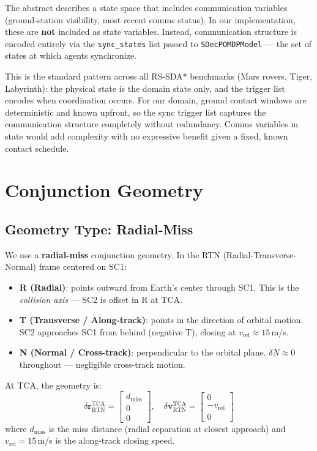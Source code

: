 \documentclass[11pt]{article}
\begin{document}
The abstract describes a state space that includes communication variables
(ground-station visibility, most recent comms status). In our implementation,
these are \textbf{not} included as state variables. Instead, communication
structure is encoded entirely via the \texttt{sync\_states} list passed to
\texttt{SDecPOMDPModel} --- the set of states at which agents synchronize.

This is the standard pattern across all RS-SDA* benchmarks (Mars rovers,
Tiger, Labyrinth): the physical state is the domain state only, and the
trigger list encodes when coordination occurs. For our domain, ground contact
windows are deterministic and known upfront, so the sync trigger list captures
the communication structure completely without redundancy. Comms variables in
state would add complexity with no expressive benefit given a fixed, known
contact schedule.

\section{Conjunction Geometry}

\subsection{Geometry Type: Radial-Miss}

We use a \textbf{radial-miss} conjunction geometry. In the RTN (Radial-Transverse-Normal)
frame centered on SC1:

\begin{itemize}
  \item \textbf{R (Radial)}: points outward from Earth's center through SC1.
        This is the \emph{collision axis} --- SC2 is offset in R at TCA.
  \item \textbf{T (Transverse / Along-track)}: points in the direction of orbital
        motion. SC2 approaches SC1 from behind (negative T), closing at
        $v_\text{rel} \approx 15$\,m/s.
  \item \textbf{N (Normal / Cross-track)}: perpendicular to the orbital plane.
        $\delta N \approx 0$ throughout --- negligible cross-track motion.
\end{itemize}

At TCA, the geometry is:
\begin{equation}
  \delta \mathbf{r}_\text{RTN}^\text{TCA} =
    \begin{bmatrix} d_\text{miss} \\ 0 \\ 0 \end{bmatrix}, \quad
  \delta \mathbf{v}_\text{RTN}^\text{TCA} =
    \begin{bmatrix} 0 \\ -v_\text{rel} \\ 0 \end{bmatrix}
\end{equation}
where $d_\text{miss}$ is the miss distance (radial separation at closest approach)
and $v_\text{rel} = 15$\,m/s is the along-track closing speed.
\end{document}

